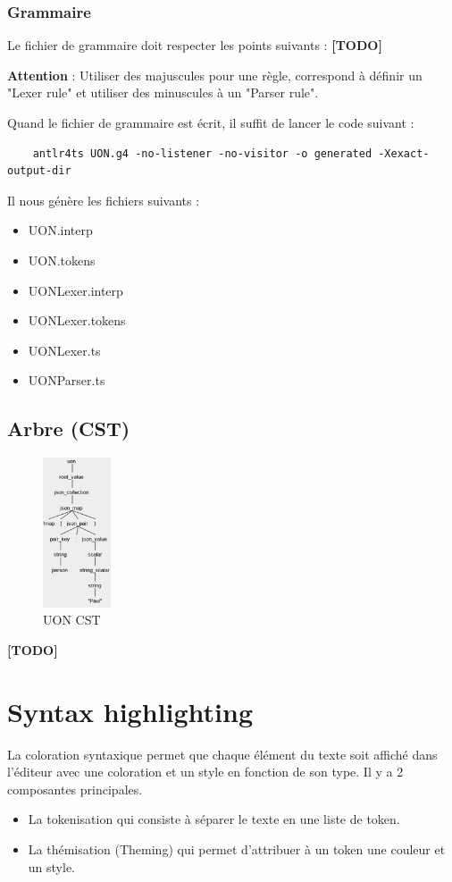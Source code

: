 \documentclass[
    iict, %
    il, %
]{heig-tb}
\begin{document}
\subsubsection{Grammaire}
Le fichier de grammaire doit respecter les points suivants : \textbf{[TODO]}

\textbf{Attention} : Utiliser des majuscules pour une règle, correspond à définir un "Lexer rule" et utiliser des minuscules à un  "Parser rule".

Quand le fichier de grammaire est écrit, il suffit de lancer le code suivant :

\begin{lstlisting}
    antlr4ts UON.g4 -no-listener -no-visitor -o generated -Xexact-output-dir
\end{lstlisting}

Il nous génère les fichiers suivants :
\begin{itemize}
    \item UON.interp
    \item UON.tokens
    \item UONLexer.interp
    \item UONLexer.tokens
    \item UONLexer.ts
    \item UONParser.ts
\end{itemize}

\subsection{Arbre (CST)}
\begin{figure}[!ht]
    \begin{center}
        \includegraphics[width=2cm]{assets/figures/tree.png}
    \end{center}
    \caption[UON CST]{\label{uon-tree} UON CST}
\end{figure}

\textbf{[TODO]}

\section{Syntax highlighting}
La coloration syntaxique permet que chaque élément du texte soit affiché dans l'éditeur avec une coloration et un style en fonction de son type.
Il y a 2 composantes principales.
\begin{itemize}
    \item La tokenisation qui consiste à séparer le texte en une liste de token.
    \item La thémisation (Theming) qui permet d'attribuer à un token une couleur et un style.
\end{itemize}
\end{document}
